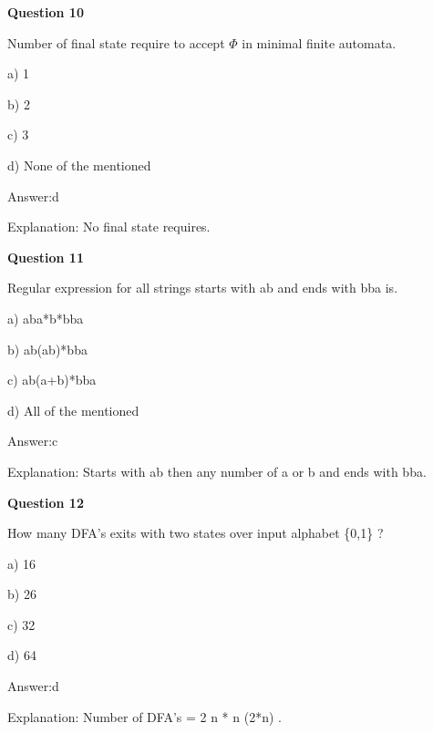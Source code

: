 \documentclass{article}
\begin{document}
\begin{mdframed}[linewidth=1pt, roundcorner=5pt, linecolor=gray!30, backgroundcolor=gray!5]
\textbf{Question 10} 

Number of final state require to accept $\Phi$ in minimal finite automata.

a) 1

b) 2

c) 3

d) None of the mentioned
\vspace{5pt} \par
\begin{tcolorbox}[colback=green!5, colframe=green!40!black, title=Solution]
Answer:d

Explanation: No final state requires.
\end{tcolorbox}
\end{mdframed}

\begin{mdframed}[linewidth=1pt, roundcorner=5pt, linecolor=gray!30, backgroundcolor=gray!5]
\textbf{Question 11} 

Regular expression for all strings starts with ab and ends with bba is.

a) aba*b*bba

b) ab(ab)*bba

c) ab(a+b)*bba

d) All of the mentioned
\vspace{5pt} \par
\begin{tcolorbox}[colback=green!5, colframe=green!40!black, title=Solution]
Answer:c

Explanation: Starts with ab then any number of a or b and ends with bba.
\end{tcolorbox}
\end{mdframed}

\begin{mdframed}[linewidth=1pt, roundcorner=5pt, linecolor=gray!30, backgroundcolor=gray!5]
\textbf{Question 12} 

How many DFA's exits with two states over input alphabet \{0,1\} ?

a) 16

b) 26

c) 32

d) 64
\vspace{5pt} \par
\begin{tcolorbox}[colback=green!5, colframe=green!40!black, title=Solution]
Answer:d

Explanation: Number of DFA's = 2
n
 * n
(2*n)
.
\end{tcolorbox}
\end{mdframed}
\newpage
\end{document}
